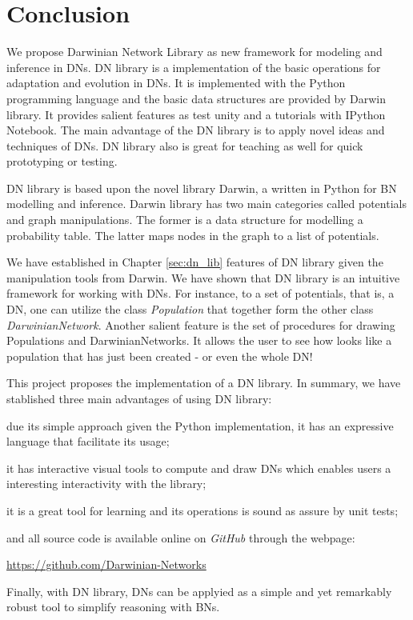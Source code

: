 \chapter{Conclusion}
\label{sec:conclusion}

We propose Darwinian Network Library as new framework for modeling and inference in DNs.
DN library is a implementation of the basic operations for adaptation and evolution in DNs.
It is implemented with the Python programming language and the basic data structures are provided by Darwin library.
It provides salient features as test unity and a tutorials with IPython Notebook.
The main advantage of the DN library is to apply novel ideas and techniques of DNs.
DN library also is great for teaching as well for quick prototyping or testing.


DN library is based upon the novel library Darwin, a written in Python for BN modelling and inference.
Darwin library has two main categories called potentials and graph manipulations.
The former is a data structure for modelling a probability table.
The latter maps nodes in the graph to a list of potentials.


We have established in Chapter \ref{sec:dn_lib} features of DN library given the manipulation tools from Darwin.
We have shown that DN library is an intuitive framework for working with DNs.
For instance, to a set of potentials, that is, a DN, one can utilize the class \emph{Population} that together form the other class \emph{DarwinianNetwork}.
Another salient feature is the set of procedures for drawing Populations and DarwinianNetworks.
It allows the user to see how looks like a population that has just been created - or even the whole DN!


This project proposes the implementation of a DN library.
In summary, we have stablished three main advantages of using DN library:
\begin{inparaenum}[(i)]
\item due its simple approach given the Python implementation, it has an expressive language that facilitate its usage;
\item it has interactive visual tools to compute and draw DNs which enables users a interesting interactivity with the library;
\item it is a great tool for learning and its operations is sound as assure by unit tests;
\item and all source code is available online on \emph{GitHub} through the webpage:
\end{inparaenum}
\begin{center}
\url{https://github.com/Darwinian-Networks}
\end{center}
Finally, with DN library, DNs can be applyied as a simple and yet remarkably robust tool to simplify reasoning with BNs.
